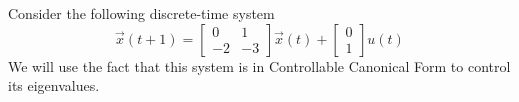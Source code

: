


Consider the following discrete-time system
\begin{equation}
 \vec{x}(t + 1) 
= \begin{bmatrix}
0 & 1 \\
-2 & -3
\end{bmatrix}
\vec{x}(t) + 
\begin{bmatrix} 0 \\ 1 \end{bmatrix} u(t)
\end{equation}
We will use the fact that this system is in Controllable Canonical Form to control its eigenvalues.

